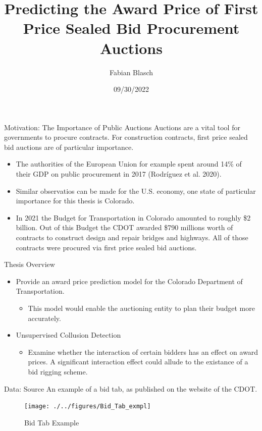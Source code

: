 \documentclass[
  11pt,
  ignorenonframetext,
]{beamer}
\title{Predicting the Award Price of First Price Sealed Bid Procurement
Auctions}
\author{Fabian Blasch}
\date{09/30/2022}
\providecommand{\tightlist}{%
  \setlength{\itemsep}{0pt}\setlength{\parskip}{0pt}}
\begin{document}
\frame{\titlepage}

\begin{frame}{Motivation: The Importance of Public Auctions}
\protect\hypertarget{motivation-the-importance-of-public-auctions}{}
Auctions are a vital tool for governments to procure contracts. For
construction contracts, first price sealed bid auctions are of
particular importance.

\begin{itemize}
\item
  The authorities of the European Union for example spent around 14\% of
  their GDP on public procurement in 2017 (Rodríguez et al. 2020).
\item
  Similar observatios can be made for the U.S. economy, one state of
  particular importance for this thesis is Colorado.
\item
  In 2021 the Budget for Transportation in Colorado amounted to roughly
  \$2 billion. Out of this Budget the CDOT awarded \$790 millions worth
  of contracts to construct design and repair bridges and highways. All
  of those contracts were procured via first price sealed bid auctions.
\end{itemize}
\end{frame}

\begin{frame}{Thesis Overview}
\protect\hypertarget{thesis-overview}{}
\begin{itemize}
\item
  Provide an award price prediction model for the Colorado Department of
  Transportation.

  \begin{itemize}
  \tightlist
  \item
    This model would enable the auctioning entity to plan their budget
    more accurately.
  \end{itemize}
\item
  Unsupervised Collusion Detection

  \begin{itemize}
  \tightlist
  \item
    Examine whether the interaction of certain bidders has an effect on
    award prices. A significant interaction effect could allude to the
    existance of a bid rigging scheme.
  \end{itemize}
\end{itemize}
\end{frame}

\begin{frame}{Data: Source}
\protect\hypertarget{data-source}{}
An example of a bid tab, as published on the website of the CDOT.

\begin{figure}

{\centering \texttt{[image: ./../figures/Bid\_Tab\_exmpl]} 

}

\caption{Bid Tab Example}\label{fig:unnamed-chunk-2}
\end{figure}
\end{frame}
\end{document}
